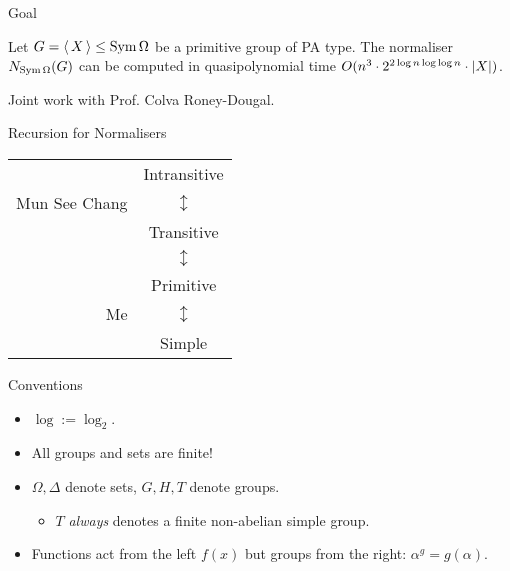 \begin{frame}{Goal}
    \begin{thm}
        Let $G =  \left\langle \, X \, \right\rangle  \leq \operatorname{Sym} \Omega$ be a primitive group
        of {\color{blue} PA type}.
        The normaliser
        $N_{\operatorname{Sym} \Omega}(G)$
        can be computed in {\color{blue} quasipolynomial} time
        $O(n ^ 3 \cdot 2 ^ {2 \log n \log \log n} \cdot  \left| X \right| )$.
    \end{thm}

    \vspace{1em}
    \pause
    Joint work with Prof. Colva Roney-Dougal.
\end{frame}

\begin{frame}{Recursion for Normalisers}
    \begin{center}
        \hspace{-5em}
        \begin{tabular}{r c}
            & Intransitive
            \\
            Mun See Chang & $\updownarrow$
            \\
            & Transitive
            \\
            & $\updownarrow$
            \\
            & Primitive
            \\
            Me & $\updownarrow$
            \\
            & Simple
        \end{tabular}
    \end{center}
\end{frame}

\begin{frame}{Conventions}
\begin{itemize}
\setlength\itemsep{1em}
\item
$\log := \log_2$.
\pause
\item
All groups and sets are finite!
\pause
\item
$\Omega, \Delta$ denote sets,
$G, H, T$ denote groups.
\pause
\begin{itemize}
    \item
    $T$ \emph{always} denotes a finite non-abelian simple group.
    \pause
\end{itemize}
\item
Functions act from the left $f(x)$
but groups from the right: $\alpha ^ g = g(\alpha)$.
\end{itemize}
\end{frame}
